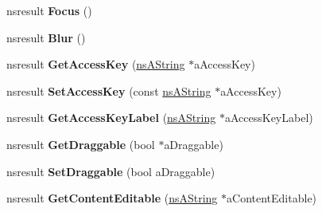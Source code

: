 \begin{DoxyCompactItemize}
\item 
\mbox{\label{interfacens_i_d_o_m_h_t_m_l_element_a7e430707961d0102152f31e4d236733c}} 
nsresult {\bfseries Focus} ()
\item 
\mbox{\label{interfacens_i_d_o_m_h_t_m_l_element_a2ac207c5837418b679904ddb13f074e2}} 
nsresult {\bfseries Blur} ()
\item 
\mbox{\label{interfacens_i_d_o_m_h_t_m_l_element_a47f61f3f55c473d9ced5e53caa173034}} 
nsresult {\bfseries Get\+Access\+Key} (\hyperlink{structns_string_container}{ns\+A\+String} $\ast$a\+Access\+Key)
\item 
\mbox{\label{interfacens_i_d_o_m_h_t_m_l_element_af749d52a4b0a9e31bc37239cceae6c28}} 
nsresult {\bfseries Set\+Access\+Key} (const \hyperlink{structns_string_container}{ns\+A\+String} $\ast$a\+Access\+Key)
\item 
\mbox{\label{interfacens_i_d_o_m_h_t_m_l_element_afd66a2c49b9a76ddabc7a54440232750}} 
nsresult {\bfseries Get\+Access\+Key\+Label} (\hyperlink{structns_string_container}{ns\+A\+String} $\ast$a\+Access\+Key\+Label)
\item 
\mbox{\label{interfacens_i_d_o_m_h_t_m_l_element_ae643a4201f9aa2935422c6ead015028c}} 
nsresult {\bfseries Get\+Draggable} (bool $\ast$a\+Draggable)
\item 
\mbox{\label{interfacens_i_d_o_m_h_t_m_l_element_a90993b450b55b0bcdadda1c640d75ab8}} 
nsresult {\bfseries Set\+Draggable} (bool a\+Draggable)
\item 
\mbox{\label{interfacens_i_d_o_m_h_t_m_l_element_a51ac9eb63dc2ddcf3f0fe9d525784499}} 
nsresult {\bfseries Get\+Content\+Editable} (\hyperlink{structns_string_container}{ns\+A\+String} $\ast$a\+Content\+Editable)
\item 
\mbox{\label{interfacens_i_d_o_m_h_t_m_l_element_ac83e9360996bef3d55ff7b4ed612aeee}} 

\end{DoxyCompactItemize}
